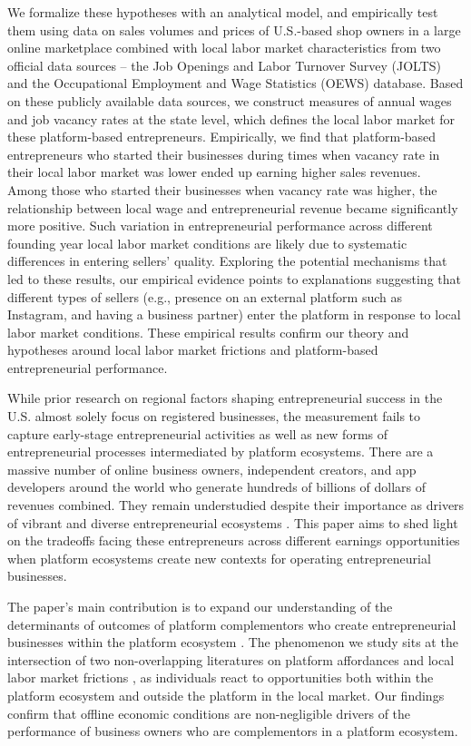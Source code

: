 \documentclass[letterpaper,12pt]{article}
\begin{document}
We formalize these hypotheses with an analytical model, and empirically test them using data on sales volumes and prices of U.S.-based shop owners in a large online marketplace combined with local labor market characteristics from two official data sources – the Job Openings and Labor Turnover Survey (JOLTS) and the Occupational Employment and Wage Statistics (OEWS) database. Based on these publicly available data sources, we construct measures of annual wages and job vacancy rates at the state level, which defines the local labor market for these platform-based entrepreneurs. Empirically, we find that platform-based entrepreneurs who started their businesses during times when vacancy rate in their local labor market was lower ended up earning higher sales revenues. Among those who started their businesses when vacancy rate was higher, the relationship between local wage and entrepreneurial revenue became significantly more positive. Such variation in entrepreneurial performance across different founding year local labor market conditions are likely due to systematic differences in entering sellers' quality. Exploring the potential mechanisms that led to these results, our empirical evidence points to explanations suggesting that different types of sellers (e.g., presence on an external platform such as Instagram, and having a business partner) enter the platform in response to local labor market conditions. These empirical results confirm our theory and hypotheses around local labor market frictions and platform-based entrepreneurial performance. 

While prior research on regional factors shaping entrepreneurial success in the U.S. almost solely focus on registered businesses, the measurement fails to capture early-stage entrepreneurial activities as well as new forms of entrepreneurial processes intermediated by platform ecosystems. There are a massive number of online business owners, independent creators, and app developers around the world who generate hundreds of billions of dollars of revenues combined. They remain understudied despite their importance as drivers of vibrant and diverse entrepreneurial ecosystems \citep{shane_promise_2000,aldrich_unicorns_2018,cullen_outsourcing_2021}. This paper aims to shed light on the tradeoffs facing these entrepreneurs across different earnings opportunities when platform ecosystems create new contexts for operating entrepreneurial businesses.

The paper’s main contribution is to expand our understanding of the determinants of outcomes of platform complementors who create entrepreneurial businesses within the platform ecosystem \citep{cullen_outsourcing_2021}. The phenomenon we study sits at the intersection of two non-overlapping literatures on platform affordances \citep{gawer_bridging_2014,mcintyre_multisided_2021} and local labor market frictions \citep{campbell_rethinking_2012,starr_strategic_2018}, as individuals react to opportunities both within the platform ecosystem and outside the platform in the local market. Our findings confirm that offline economic conditions are non-negligible drivers of the performance of business owners who are complementors in a platform ecosystem.
\end{document}
